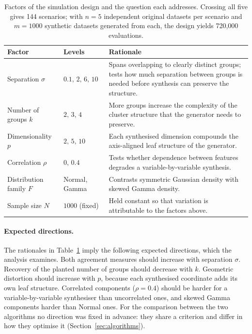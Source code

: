 \documentclass[pdflatex,referee]{sn-jnl}
\begin{document}
\begin{table}[t]
\centering
\caption{Factors of the simulation design and the question each addresses.
         Crossing all five gives 144 scenarios; with $n=5$ independent original
         datasets per scenario and $m=1000$ synthetic datasets generated from
         each, the design yields 720{,}000 evaluations.}
\label{tab:design}
\small
\begin{tabular}{llp{6.2cm}}
\toprule
Factor & Levels & Rationale \\
\midrule
Separation $\sigma$      & $0.1,\,2,\,6,\,10$ & Spans overlapping to clearly
  distinct groups; tests how much separation between groups is needed before
  synthesis can preserve the structure. \\
Number of groups $k$     & $2,\,3,\,4$        & More groups increase the
  complexity of the cluster structure that the generator needs to
  preserve. \\
Dimensionality $p$       & $2,\,5,\,10$       & Each synthesised dimension
  compounds the axis-aligned leaf structure of the generator. \\
Correlation $\rho$       & $0,\,0.4$          & Tests whether dependence
  between features degrades a variable-by-variable synthesis. \\
Distribution family $F$  & Normal, Gamma      & Contrasts symmetric Gaussian
  density with skewed Gamma density. \\
\midrule
Sample size $N$          & $1000$ (fixed)     & Held constant so that
  variation is attributable to the factors above. \\
\bottomrule
\end{tabular}
\end{table}

\paragraph{Expected directions.} The rationales in Table~\ref{tab:design}
imply the following expected directions, which the analysis examines. Both
agreement measures should increase with separation $\sigma$. Recovery of the
planted number of groups should decrease with $k$. Geometric distortion should
increase with $p$, because each synthesised coordinate adds its own leaf
structure. Correlated components ($\rho = 0.4$) should be harder for a
variable-by-variable synthesiser than uncorrelated ones, and skewed Gamma
components harder than Normal ones. For the comparison between the two
algorithms no direction was fixed in advance: they share a criterion and
differ in how they optimise it (Section~\ref{sec:algorithms}).
\end{document}
